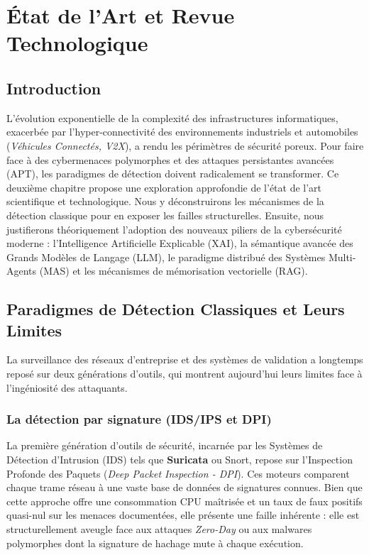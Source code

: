 \documentclass[a4paper, 12pt]{report}
\begin{document}
\chapter{État de l'Art et Revue Technologique}
\label{chap:etat_art}

\section*{Introduction}
L'évolution exponentielle de la complexité des infrastructures informatiques, exacerbée par l'hyper-connectivité des environnements industriels et automobiles (\textit{Véhicules Connectés, V2X}), a rendu les périmètres de sécurité poreux. Pour faire face à des cybermenaces polymorphes et des attaques persistantes avancées (APT), les paradigmes de détection doivent radicalement se transformer. Ce deuxième chapitre propose une exploration approfondie de l'état de l'art scientifique et technologique. Nous y déconstruirons les mécanismes de la détection classique pour en exposer les failles structurelles. Ensuite, nous justifierons théoriquement l'adoption des nouveaux piliers de la cybersécurité moderne : l'Intelligence Artificielle Explicable (XAI), la sémantique avancée des Grands Modèles de Langage (LLM), le paradigme distribué des Systèmes Multi-Agents (MAS) et les mécanismes de mémorisation vectorielle (RAG). 

\section{Paradigmes de Détection Classiques et Leurs Limites}
\label{sec:detection_classique}

La surveillance des réseaux d'entreprise et des systèmes de validation a longtemps reposé sur deux générations d'outils, qui montrent aujourd'hui leurs limites face à l'ingéniosité des attaquants.

\subsection{La détection par signature (IDS/IPS et DPI)}
La première génération d'outils de sécurité, incarnée par les Systèmes de Détection d'Intrusion (IDS) tels que \textbf{Suricata} \cite{suricata_oisf} ou Snort, repose sur l'Inspection Profonde des Paquets (\textit{Deep Packet Inspection - DPI}). Ces moteurs comparent chaque trame réseau à une vaste base de données de signatures connues. 
Bien que cette approche offre une consommation CPU maîtrisée et un taux de faux positifs quasi-nul sur les menaces documentées, elle présente une faille inhérente : elle est structurellement aveugle face aux attaques \textit{Zero-Day} ou aux malwares polymorphes dont la signature de hachage mute à chaque exécution.
\end{document}
